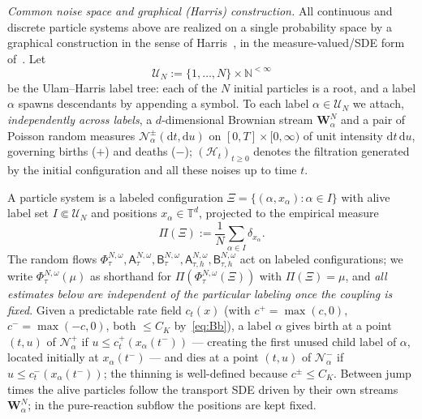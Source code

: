 \documentclass[a4paper,fleqn]{cas-sc}
\theoremstyle{definition}
\theoremstyle{remark}
\begin{document}
\emph{Common noise space and graphical (Harris) construction.} All continuous and
discrete particle systems above are realized on a single probability space by a
graphical construction in the sense of
Harris~\cite{harris1972nearest,harris1978additive}, in the measure-valued/SDE form
of~\cite{fournier2004microscopic,bansaye2015stochastic}. Let
\[
\mathcal U_N:=\{1,\ldots,N\}\times\mathbb N^{<\infty}
\]
be the Ulam--Harris label tree: each of the $N$ initial particles is a root, and a
label $\alpha$ spawns descendants by appending a symbol. To each label
$\alpha\in\mathcal U_N$ we attach, \emph{independently across labels}, a
$d$-dimensional Brownian stream $\mathbf W^N_\alpha$ and a pair of Poisson random
measures $\mathcal N^{\pm}_\alpha(\mathrm dt,\mathrm du)$ on $[0,T]\times[0,\infty)$
of unit intensity $\mathrm dt\,\mathrm du$, governing births ($+$) and deaths
($-$); $(\mathcal H_t)_{t\ge0}$ denotes the filtration generated by the initial
configuration and all these noises up to time $t$.

A particle system is a labeled configuration
$\Xi=\{(\alpha,x_\alpha):\alpha\in I\}$ with alive label set $I\Subset\mathcal U_N$
and positions $x_\alpha\in\mathbb T^d$, projected to the empirical measure
\[
\Pi(\Xi):=\frac1N\sum_{\alpha\in I}\delta_{x_\alpha}.
\]
The random flows $\Phi^{N,\omega}_\tau,\mathsf A^{N,\omega}_\tau,
\mathsf B^{N,\omega}_\tau,\mathsf A^{N,\omega}_{\tau,h},\mathsf B^{N,\omega}_{\tau,h}$
act on labeled configurations; we write $\Phi^{N,\omega}_\tau(\mu)$ as shorthand for
$\Pi(\Phi^{N,\omega}_\tau(\Xi))$ with $\Pi(\Xi)=\mu$, and \emph{all estimates below
are independent of the particular labeling once the coupling is fixed}. Given a
predictable rate field $c_t(x)$ (with $c^+=\max(c,0)$, $c^-=\max(-c,0)$, both
$\le C_K$ by~\eqref{eq:Bb}), a label $\alpha$ gives birth at a point $(t,u)$ of
$\mathcal N^{+}_\alpha$ if $u\le c^+_t(x_\alpha(t^-))$ --- creating the first unused
child label of $\alpha$, located initially at $x_\alpha(t^-)$ --- and dies at a
point $(t,u)$ of $\mathcal N^{-}_\alpha$ if $u\le c^-_t(x_\alpha(t^-))$; the thinning
is well-defined because $c^\pm\le C_K$. Between jump times the alive particles
follow the transport SDE driven by their own streams $\mathbf W^N_\alpha$; in the
pure-reaction subflow the positions are kept fixed.
\end{document}
